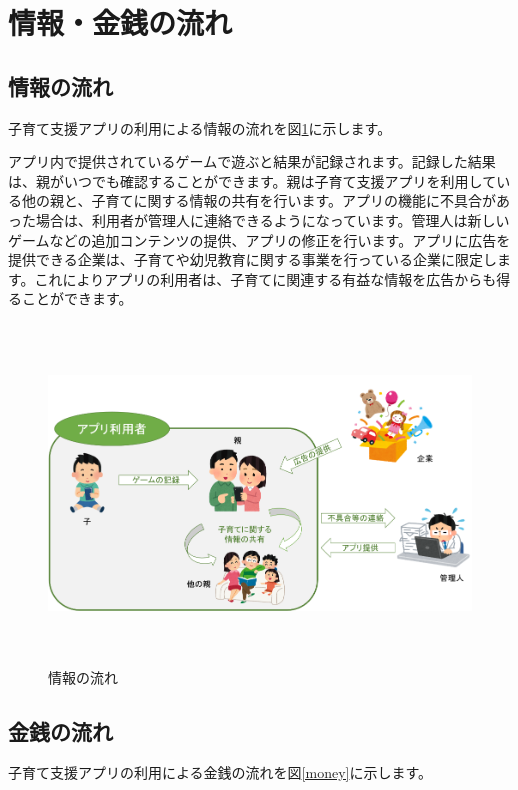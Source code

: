 \documentclass[a4j]{jarticle}
\begin{document}
\section{情報・金銭の流れ}

\subsection{情報の流れ}
子育て支援アプリの利用による情報の流れを図\ref{info}に示します。		%

アプリ内で提供されているゲームで遊ぶと結果が記録されます。記録した結果は、親がいつでも確認することができます。親は子育て支援アプリを利用している他の親と、子育てに関する情報の共有を行います。アプリの機能に不具合があった場合は、利用者が管理人に連絡できるようになっています。管理人は新しいゲームなどの追加コンテンツの提供、アプリの修正を行います。アプリに広告を提供できる企業は、子育てや幼児教育に関する事業を行っている企業に限定します。これによりアプリの利用者は、子育てに関連する有益な情報を広告からも得ることができます。
\begin{figure}[h]
  \begin{center}
    \includegraphics[width = 14cm, height = 9cm]{section5_info.png}
    \caption{情報の流れ}
    \label{info}
  \end{center}
\end{figure}

\newpage
\subsection{金銭の流れ}
子育て支援アプリの利用による金銭の流れを図\ref{money}に示します。
\end{document}
